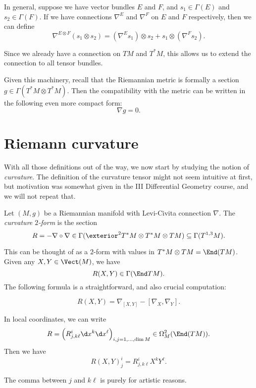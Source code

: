 \documentclass[a4paper]{article}
\begin{document}
In general, suppose we have vector bundles $E$ and $F$, and $s_1 \in \Gamma(E)$ and $s_2 \in \Gamma(F)$. If we have connections $\nabla^E$ and $\nabla^F$ on $E$ and $F$ respectively, then we can define
\[
  \nabla^{E\otimes F} (s_1 \otimes s_2) = (\nabla^E s_1) \otimes s_2 + s_1 \otimes (\nabla^F s_2).
\]

Since we already have a connection on $TM$ and $T^*M$, this allows us to extend the connection to all tensor bundles.

Given this machinery, recall that the Riemannian metric is formally a section $g \in \Gamma(T^*M \otimes T^*M)$. Then the compatibility with the metric can be written in the following even more compact form:
\[
  \nabla g = 0.
\]

\section{Riemann curvature}
With all those definitions out of the way, we now start by studying the notion of \emph{curvature}. The definition of the curvature tensor might not seem intuitive at first, but motivation was somewhat given in the III Differential Geometry course, and we will not repeat that.

\begin{defi}[Curvature]
  Let $(M, g)$ be a Riemannian manifold with Levi-Civita connection $\nabla$. The \emph{curvature $2$-form} is the section
  \[
    R = - \nabla \circ \nabla \in \Gamma(\exterior^2 T^*M \otimes T^*M \otimes TM) \subseteq \Gamma(T^{1, 3}M).
  \]
\end{defi}
This can be thought of as a $2$-form with values in $T^*M \otimes TM = \End(TM)$. Given any $X, Y \in \Vect(M)$, we have
\[
  R(X, Y) \in \Gamma(\End TM) .
\]
The following formula is a straightforward, and also crucial computation:
\begin{prop}
  \[
    R(X, Y) = \nabla_{[X, Y]} - [\nabla_X, \nabla_Y].
  \]
\end{prop}

In local coordinates, we can write
\[
  R = \Big(R^i_{j, k\ell} \d x^k \d x^\ell\Big)_{i, j = 1, \ldots, \dim M} \in \Omega_M^2(\End(TM)).
\]
Then we have
\[
  R(X, Y)^i_j = R^i_{j, k\ell} X^k Y^\ell.
\]

The comma between $j$ and $k\ell$ is purely for artistic reasons.
\end{document}

